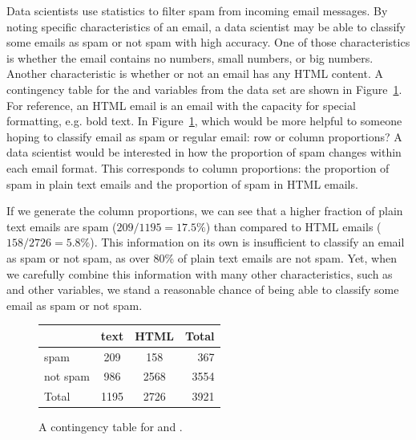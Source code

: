 \begin{example}{
Data scientists use statistics to filter spam from incoming
email messages.
By noting specific characteristics of an email,
a data scientist may be able to classify some emails as spam
or not spam with high accuracy.
One of those characteristics is whether the email
contains no numbers, small numbers, or big numbers.
Another characteristic is whether or not an email
has any HTML content.
A contingency table for the  and 
variables from the  data set are shown in
Figure~\ref{emailSpamHTMLTableTotals}.
For reference, an HTML email is an email with the capacity
for special formatting, e.g. bold text.
In Figure~\ref{emailSpamHTMLTableTotals},
which would be more helpful to someone hoping to classify
email as spam or regular email: row or column proportions?} \label{weighingRowColumnProportions}
A data scientist would be interested in how the proportion
of spam changes within each email format.
This corresponds to column proportions:
the proportion of spam in plain text emails
and the proportion of spam in HTML emails.

If we generate the column proportions, we can see
that a higher fraction of plain text emails are
spam ($209/1195 = 17.5\%$)
than compared to HTML emails ($158/2726 = 5.8\%$).
This information on its own is insufficient to classify
an email as spam or not spam, as over 80\% of plain text
emails are not spam.
Yet, when we carefully combine this information with many
other characteristics, such as  and other variables,
we stand a reasonable chance of being able to classify some
email as spam or not spam.
\end{example}

\begin{figure}[ht]
\centering
\begin{tabular}{l cc r}
  \hline
 & text & HTML & Total \\ 
  \hline
spam & 209 & 158 & 367 \\ 
not spam & 986 & 2568 & 3554 \\ 
   \hline
Total & 1195 & 2726 & 3921 \\
   \hline
\end{tabular}
\caption{A contingency table for  and .}
\label{emailSpamHTMLTableTotals}
\end{figure}

